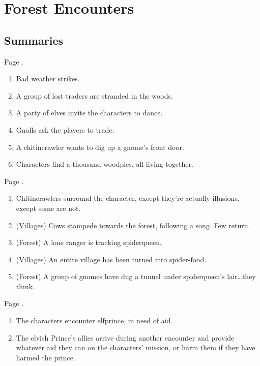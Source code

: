 \chapter{Forest Encounters}

\setcounter{enc}{0}

\section{Summaries}\label{forest_encounters}

\begin{multicols}{2}

Page \pageref{interruptions}.

\begin{enumerate}
	\item{Bad weather strikes.}
	\item{A group of lost traders are stranded in the woods.}
	\item{A party of elves invite the characters to dance.}
	\item{Gnolls ask the players to trade.}
	\item{A chitincrawler wants to dig up a gnome's front door.}
	\item{Characters find a thousand woodpies, all living together.}
\end{enumerate}

Page \pageref{spiderqueenssong}.
\begin{enumerate}
	\item{Chitincrawlers surround the character, except they're actually illusions, except some are not.}
	\item{(Villages) Cows stampede towards the forest, following a song.  Few return.}
	\item{(Forest) A lone ranger is tracking \gls{spiderqueen}.}
	\item{(Villages) An entire village has been turned into spider-food.}
	\item{(Forest) A group of gnomes have dug a tunnel under \gls{spiderqueen}'s lair\ldots they think.}
\end{enumerate}


Page \pageref{littleprince}.

\begin{enumerate}

	\item{The characters encounter \gls{elfprince}, in need of aid.}
	\item{The elvish Prince's allies arrive during another encounter and provide whatever aid they can on the characters' mission, or harm them if they have harmed the prince.}

\end{enumerate}

\end{multicols}

